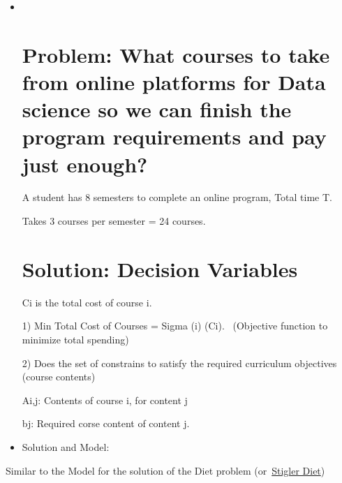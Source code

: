 \documentclass[
  letterpaper,
  DIV=11,
  numbers=noendperiod]{scrreprt}
\begin{document}
\begin{itemize}
\item ~
  \hypertarget{problem-what-courses-to-take-from-online-platforms-for-data-science-so-we-can-finish-the-program-requirements-and-pay-just-enough}{%
  \section{Problem: What courses to take from online platforms for Data
  science so we can finish the program requirements and pay just
  enough?}\label{problem-what-courses-to-take-from-online-platforms-for-data-science-so-we-can-finish-the-program-requirements-and-pay-just-enough}}

  A student has 8 semesters to complete an online program, Total time T.

  Takes 3 courses per semester = 24 courses.

  \hypertarget{solution-decision-variables}{%
  \section{Solution: Decision
  Variables}\label{solution-decision-variables}}

  Ci is the total cost of course i.

  1) Min Total Cost of Courses = Sigma (i) (Ci).~ (Objective function to
  minimize total spending)

  2) Does the set of constrains to satisfy the required curriculum
  objectives (course contents)

  Ai,j: Contents of course i, for content j

  bj: Required corse content of content j.
\item
  Solution and Model:
\end{itemize}

Similar to the Model for the solution of the Diet problem
(or~\href{https://en.wikipedia.org/wiki/Stigler_diet}{Stigler Diet})
\end{document}
